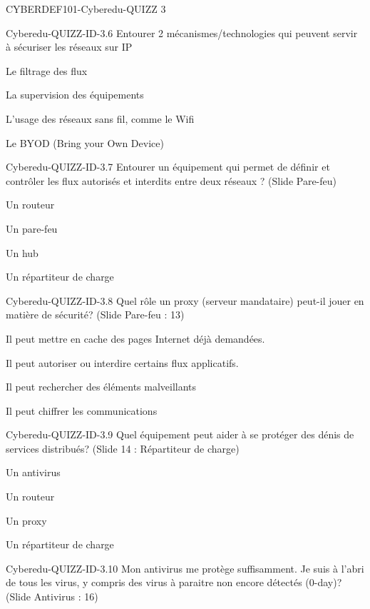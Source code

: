 \documentclass[12pt]{article}
\begin{document}
\begin{quiz}{CYBERDEF101-Cyberedu-QUIZZ 3}
\begin{multi}[multiple=true]{Cyberedu-QUIZZ-ID-3.6}
	Entourer 2 m\'ecanismes/technologies qui peuvent servir \`{a} s\'ecuriser les r\'eseaux sur IP
\item* Le filtrage des flux
\item* La supervision des \'equipements
\item L'usage des r\'eseaux sans fil, comme le Wifi
\item Le BYOD (Bring your Own Device)
\end{multi}
\begin{multi}[multiple=true]{Cyberedu-QUIZZ-ID-3.7}
	Entourer un \'equipement qui permet de d\'efinir et contr\^oler les flux autoris\'es et interdits entre deux r\'eseaux ? (Slide Pare-feu)
\item Un routeur
\item* Un pare-feu
\item Un hub
\item Un r\'epartiteur de charge
\end{multi}
\begin{multi}[multiple=true]{Cyberedu-QUIZZ-ID-3.8}
	Quel r\^ole un proxy (serveur mandataire) peut-il jouer en mati\`ere de s\'ecurit\'e? (Slide Pare-feu : 13)
\item Il peut mettre en cache des pages Internet d\'ej\`{a} demand\'ees.
\item* Il peut autoriser ou interdire certains flux applicatifs.
\item Il peut rechercher des \'el\'ements malveillants
\item Il peut chiffrer les communications
\end{multi}
\begin{multi}[multiple=true]{Cyberedu-QUIZZ-ID-3.9}
	Quel \'equipement peut aider \`{a} se prot\'eger des d\'enis de services distribu\'es? (Slide 14 : R\'epartiteur de charge)
\item Un antivirus
\item Un routeur
\item Un proxy
\item* Un r\'epartiteur de charge
\end{multi}
\begin{multi}[multiple=true]{Cyberedu-QUIZZ-ID-3.10}
	Mon antivirus me prot\`ege suffisamment. Je suis \`{a} l'abri de tous les virus, y compris des virus \`{a} paraitre non encore d\'etect\'es (0-day)? (Slide Antivirus : 16)

\end{multi}
\end{quiz}
\end{document}
